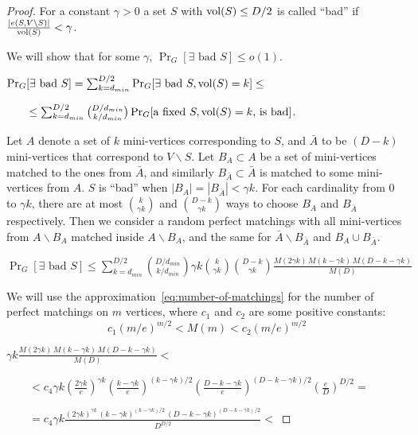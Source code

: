 \begin{proof}
    For a constant $\gamma>0$ a set $S$ with $\operatorname*{vol}(S)\leq D/2$ is called ``bad''
    if $\frac{|e(S,V\backslash S)|}{\operatorname*{vol}(S)}<\gamma$.
    
    We will show that for some $\gamma$, $\Pr_G[\exists\text{ bad }S]\leq o(1)$.
    
    $\Pr_G[\exists\text{ bad }S]
    =\sum_{k=d_{min}}^{D/2}{\Pr_G[\exists\text{ bad }S,\operatorname*{vol}(S)=k]}\leq$
    
    $\qquad\leq\sum_{k=d_{min}}^{D/2}{\binom{D/d_{min}}{k/d_{min}}\Pr_G[\text{a fixed }S,\operatorname*{vol}(S)=k\text{, is bad}]}$.
    
    Let $A$ denote a set of $k$ mini-vertices corresponding to $S$,
    and $\bar{A}$ to be $(D-k)$ mini-vertices that correspond to $V\backslash S$.
    Let $B_A\subset A$ be a set of mini-vertices matched to the ones from $\bar{A}$,
    and similarly $B_{\bar{A}}\subset\bar{A}$ is matched to some mini-vertices from $A$.
    $S$ is ``bad'' when $|B_A|=|B_{\bar{A}}|<\gamma k$.
    For each cardinality from $0$ to $\gamma k$, there are at most
    $\binom{k}{\gamma k}$ and $\binom{D-k}{\gamma k}$ ways
    to choose $B_A$ and $B_{\bar{A}}$ respectively.
    Then we consider a random perfect matchings
    with all mini-vertices from $A\backslash B_A$ matched inside $A\backslash B_A$,
    and the same for $\bar{A}\backslash B_{\bar{A}}$ and $B_A\cup B_{\bar{A}}$.
    
    $\Pr_G[\exists\text{ bad }S]\leq\sum_{k=d_{min}}^{D/2}{
        \binom{D/d_{min}}{k/d_{min}}\gamma k\binom{k}{\gamma k}\binom{D-k}{\gamma k}
        \frac{M(2\gamma k)\,M(k-\gamma k)\,M(D-k-\gamma k)}{M(D)}
    }$

    We will use the approximation~\eqref{eq:number-of-matchings}
    for the number of perfect matchings on $m$ vertices,
    where $c_1$ and $c_2$ are some positive constants:
    \begin{equation}
        c_1(m/e)^{m/2}<M(m)<c_2(m/e)^{m/2}
    \end{equation}

    $\gamma k\frac{M(2\gamma k)\,M(k-\gamma k)\,M(D-k-\gamma k)}{M(D)}<$
    
    $\qquad<c_4\gamma k
    \left(\frac{2\gamma k}{e}\right)^{\gamma k}
    \left(\frac{k-\gamma k}{e}\right)^{(k-\gamma k)/2}
    \left(\frac{D-k-\gamma k}{e}\right)^{(D-k-\gamma k)/2}
    \left(\frac{e}{D}\right)^{D/2}=$
    
    $\qquad=c_4\gamma k\frac{
        (2\gamma k)^{\gamma k}\,
        (k-\gamma k)^{(k-\gamma k)/2}\,
        (D-k-\gamma k)^{(D-k-\gamma k)/2}
    }{D^{D/2}}<$


\end{proof}
